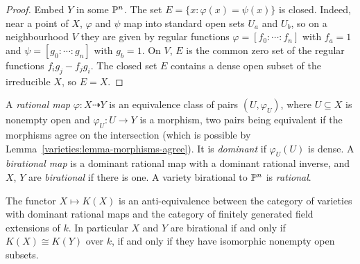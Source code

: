 \begin{proof}
Embed $Y$ in some $\mathbb{P}^n$. The set $E = \{x : \varphi(x) = \psi(x)\}$ is closed. Indeed, near a point of $X$, $\varphi$ and $\psi$ map into standard open
sets $U_a$ and $U_b$, so on a neighbourhood $V$ they are given by regular functions $\varphi = [f_0 : \cdots : f_n]$ with $f_a = 1$ and
$\psi = [g_0 : \cdots : g_n]$ with $g_b = 1$. On $V$, $E$ is the common zero set of the regular functions $f_ig_j - f_jg_i$. The closed set $E$
contains a dense open subset of the irreducible $X$, so $E = X$.
\end{proof}

\begin{definition}\label{varieties:definition-rational-map}
A \emph{rational map} $\varphi \colon X \dashrightarrow Y$ is an equivalence class of pairs $(U, \varphi_U)$, where $U \subseteq X$ is nonempty open and
$\varphi_U \colon U \to Y$ is a morphism, two pairs being equivalent if the morphisms agree on the intersection (which is possible by
Lemma~\ref{varieties:lemma-morphisms-agree}). It is \emph{dominant} if $\varphi_U(U)$ is dense. A \emph{birational map} is a dominant rational map
with a dominant rational inverse, and $X$, $Y$ are \emph{birational} if there is one. A variety birational to $\mathbb{P}^n$ is \emph{rational}.
\end{definition}

\begin{theorem}\label{varieties:theorem-birational-fields}
The functor $X \mapsto K(X)$ is an anti-equivalence between the category of varieties with dominant rational maps and the category of
finitely generated field extensions of $k$. In particular $X$ and $Y$ are birational if and only if $K(X) \cong K(Y)$ over $k$, if and only
if they have isomorphic nonempty open subsets.
\end{theorem}

